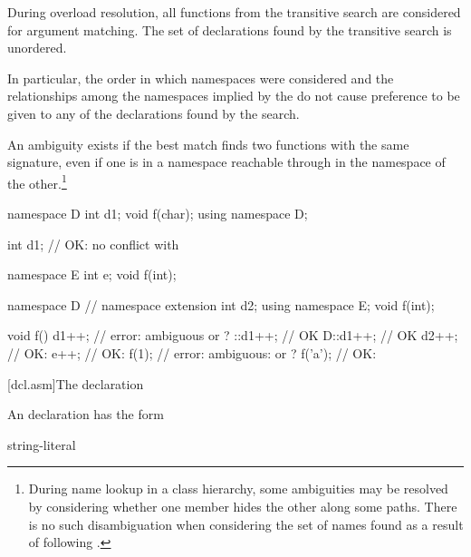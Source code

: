 \pnum
{}%
During overload resolution, all functions from the transitive search are
considered for argument matching. The set of declarations found by the
transitive search is unordered.
\begin{note}
In particular, the order in which namespaces were considered and the
relationships among the namespaces implied by the
 do not cause preference to be given to any
of the declarations found by the search.
\end{note}
An ambiguity exists if the best match finds two functions with the same
signature, even if one is in a namespace reachable through
 in the namespace of the other.\footnote{During
name lookup in a class hierarchy, some ambiguities may be
resolved by considering whether one member hides the other along some
paths. There is no such disambiguation when
considering the set of names found as a result of following
.}
\begin{example}

\begin{codeblock}
namespace D {
  int d1;
  void f(char);
}
using namespace D;

int d1;             // OK: no conflict with 

namespace E {
  int e;
  void f(int);
}

namespace D {       // namespace extension
  int d2;
  using namespace E;
  void f(int);
}

void f() {
  d1++;             // error: ambiguous  or ?
  ::d1++;           // OK
  D::d1++;          // OK
  d2++;             // OK: 
  e++;              // OK: 
  f(1);             // error: ambiguous:  or ?
  f('a');           // OK: 
}
\end{codeblock}
\end{example}%
%

[dcl.asm]{The  declaration}%
%
%

\pnum
An  declaration has the form

\begin{bnf}
\br
      string-literal \terminal{) ;}
\end{bnf}

